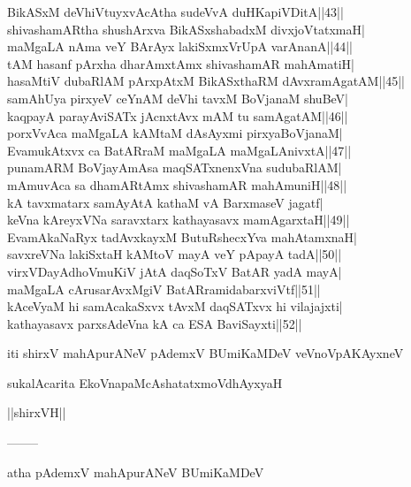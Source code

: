 \documentclass{article}
\begin{document}
BikASxM deVhiVtuyxvAcAtha sudeVvA duHKapiVDitA||43||\\
shivashamARtha shushArxva BikASxshabadxM divxjoVtatxmaH|\\
maMgaLA nAma veY BArAyx lakiSxmxVrUpA varAnanA||44||\\
tAM hasanf pArxha dharAmxtAmx shivashamAR mahAmatiH|\\
hasaMtiV dubaRlAM pArxpAtxM BikASxthaRM dAvxramAgatAM||45||\\
samAhUya pirxyeV ceYnAM deVhi tavxM BoVjanaM shuBeV|\\
kaqpayA parayAviSATx jAcnxtAvx mAM tu samAgatAM||46||\\
porxVvAca maMgaLA kAMtaM dAsAyxmi pirxyaBoVjanaM|\\
EvamukAtxvx ca BatARraM maMgaLA maMgaLAnivxtA||47||\\
punamARM BoVjayAmAsa maqSATxnenxVna sudubaRlAM|\\
mAmuvAca sa dhamARtAmx shivashamAR mahAmuniH||48||\\
kA tavxmatarx samAyAtA kathaM vA BarxmaseV jagatf|\\
keVna kAreyxVNa saravxtarx kathayasavx mamAgarxtaH||49||\\
EvamAkaNaRyx tadAvxkayxM ButuRshecxYva mahAtamxnaH|\\
savxreVNa lakiSxtaH kAMtoV mayA veY pApayA tadA||50||\\
virxVDayAdhoVmuKiV jAtA daqSoTxV BatAR yadA mayA|\\
maMgaLA cArusarAvxMgiV BatARramidabarxviVtf||51||\\
kAceVyaM hi samAcakaSxvx tAvxM daqSATxvx hi vilajajxti|\\
kathayasavx parxsAdeVna kA ca ESA BaviSayxti||52||

\begin{center}
iti shirxV mahApurANeV pAdemxV BUmiKaMDeV veVnoVpAKAyxneV
\end{center}

\begin{center}
sukalAcarita EkoVnapaMcAshatatxmoVdhAyxyaH
\end{center}

\begin{center}
||shirxVH||
\end{center}

\begin{center}
--------
\end{center}

\begin{center}
atha pAdemxV mahApurANeV BUmiKaMDeV
\end{center}
\end{document}
